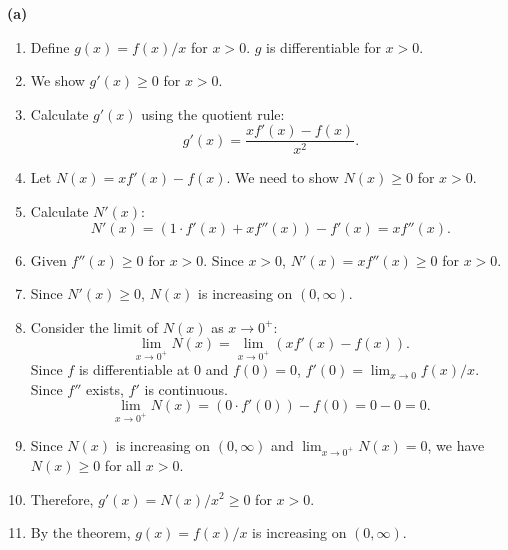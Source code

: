\documentclass{article}
\begin{document}
\textbf{(a)}
\begin{enumerate}
    \item Define \(g(x) = f(x)/x\) for \(x > 0\). \(g\) is differentiable for \(x>0\).
    \item We show \(g'(x) \ge 0\) for \(x > 0\).
    \item Calculate \(g'(x)\) using the quotient rule:
    \[ g'(x) = \frac{x f'(x) - f(x)}{x^2}. \]
    \item Let \(N(x) = x f'(x) - f(x)\). We need to show \(N(x) \ge 0\) for \(x > 0\).
    \item Calculate \(N'(x)\):
    \[ N'(x) = (1 \cdot f'(x) + x f''(x)) - f'(x) = x f''(x). \]
    \item Given \(f''(x) \ge 0\) for \(x > 0\). Since \(x > 0\), \(N'(x) = x f''(x) \ge 0\) for \(x > 0\).
    \item Since \(N'(x) \ge 0\), \(N(x)\) is increasing on \((0, \infty)\).
    \item Consider the limit of \(N(x)\) as \(x \to 0^+\):
    \[ \lim_{x \to 0^+} N(x) = \lim_{x \to 0^+} (x f'(x) - f(x)). \]
    Since \(f\) is differentiable at 0 and \(f(0)=0\), \(f'(0) = \lim_{x \to 0} f(x)/x\). Since \(f''\) exists, \(f'\) is continuous.
    \[ \lim_{x \to 0^+} N(x) = (0 \cdot f'(0)) - f(0) = 0 - 0 = 0. \]
    \item Since \(N(x)\) is increasing on \((0, \infty)\) and \(\lim_{x \to 0^+} N(x) = 0\), we have \(N(x) \ge 0\) for all \(x > 0\).
    \item Therefore, \(g'(x) = N(x)/x^2 \ge 0\) for \(x > 0\).
    \item By the theorem, \(g(x) = f(x)/x\) is increasing on \((0, \infty)\).
\end{enumerate}
\end{document}

